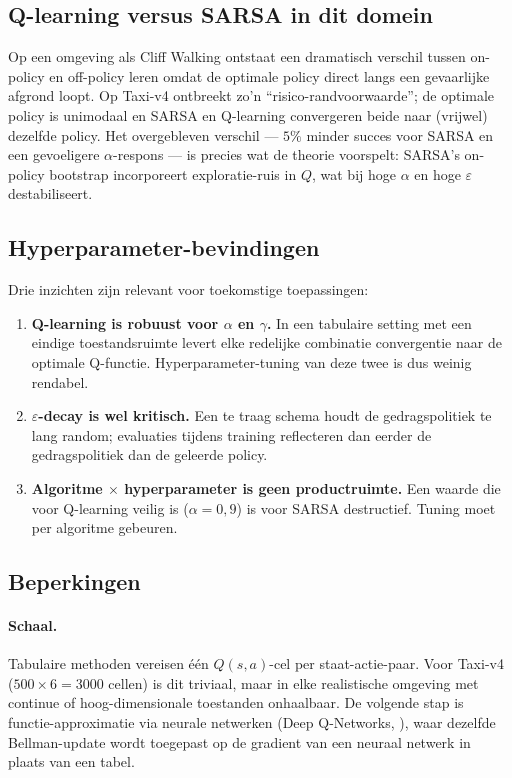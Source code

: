 \documentclass[11pt,a4paper]{article}
\begin{document}
\subsection{Q-learning versus SARSA in dit domein}

Op een omgeving als Cliff Walking
\cite[Voorbeeld 6.6]{sutton_barto_2018} ontstaat een dramatisch
verschil tussen on-policy en off-policy leren omdat de optimale policy
direct langs een gevaarlijke afgrond loopt. Op Taxi-v4 ontbreekt zo'n
``risico-randvoorwaarde''; de optimale policy is unimodaal en SARSA en
Q-learning convergeren beide naar (vrijwel) dezelfde policy. Het
overgebleven verschil --- $5\%$ minder succes voor SARSA en een
gevoeligere $\alpha$-respons --- is precies wat de theorie voorspelt:
SARSA's on-policy bootstrap incorporeert exploratie-ruis in $Q$, wat
bij hoge $\alpha$ en hoge $\varepsilon$ destabiliseert.

\subsection{Hyperparameter-bevindingen}

Drie inzichten zijn relevant voor toekomstige toepassingen:

\begin{enumerate}
  \item \textbf{Q-learning is robuust voor $\alpha$ en $\gamma$.}
        In een tabulaire setting met een eindige toestandsruimte
        levert elke redelijke combinatie convergentie naar de optimale
        Q-functie. Hyperparameter-tuning van deze twee is dus weinig
        rendabel.
  \item \textbf{$\varepsilon$-decay is wel kritisch.} Een te
        traag schema houdt de gedragspolitiek te lang random;
        evaluaties tijdens training reflecteren dan eerder de
        gedragspolitiek dan de geleerde policy.
  \item \textbf{Algoritme $\times$ hyperparameter is geen
        productruimte.} Een waarde die voor Q-learning veilig is
        ($\alpha=0{,}9$) is voor SARSA destructief. Tuning moet per
        algoritme gebeuren.
\end{enumerate}

\subsection{Beperkingen}

\paragraph{Schaal.} Tabulaire methoden vereisen \'e\'en
$Q(s,a)$-cel per staat-actie-paar. Voor Taxi-v4 ($500 \times 6 = 3000$
cellen) is dit triviaal, maar in elke realistische omgeving met
continue of hoog-dimensionale toestanden onhaalbaar. De volgende stap
is functie-approximatie via neurale netwerken (Deep Q-Networks,
\cite{mnih_2015}), waar dezelfde Bellman-update wordt toegepast op de
gradient van een neuraal netwerk in plaats van een tabel.
\end{document}

